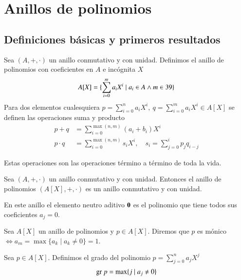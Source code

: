 
\chapter{Anillos de polinomios}

\section{Definiciones básicas y primeros resultados}

\begin{dfn}
	Sea $(A, +, \cdot)$ un anillo conmutativo y con unidad. Definimos el anillo de polinomios con coeficientes en $A$ e incógnita $X$
	\begin{align*}
		A[X] = \{\sum_{i = 0}^m a_i X^i \mid a_i \in A \land m \in 39\}
	\end{align*}
	Para dos elementos cualesquiera $p = \sum_{i=0}^{n}a_iX^i,\ q = \sum_{i=0}^m a_iX^i \in A[X]$ se definen las operaciones suma y producto
	\begin{align*}
		p+q &= \sum_{i=0}^{\max(n,m)} (a_i + b_i) X^i \\
		p \cdot q &= \sum_{i=0}^{\max(n,m)} s_iX^i,\quad s_i = \sum_{j=0}^i p_jq_{i-j}
	\end{align*}
\end{dfn}

Estas operaciones son las operaciones término a término de toda la vida.

\begin{pro}
	Sea $(A, +, \cdot)$ un anillo conmutativo y con unidad. Entonces el anillo de polinomios $(A[X], +, \cdot)$ es un anillo conmutativo y con unidad.
\end{pro}

En este anillo el elemento neutro aditivo $\mathbf{0}$ es el polinomio que tiene todos sus coeficientes $a_j = 0$.

\begin{dfn}
	Sea $A[X]$ un anillo de polinomios y $p \in A[X]$. Diremos que $p$ es mónico $\iff a_m = \max\{a_k \mid a_k \neq 0\} = 1$.
\end{dfn}

\begin{dfn}
	Sea $p \in A[X]$. Definimos el grado del polinomio $p = \sum_{j=0}^n a_jX^j$
	\begin{align}
		\text{gr } p = \max \{j \mid a_j \neq 0\}
	\end{align}
\end{dfn}

